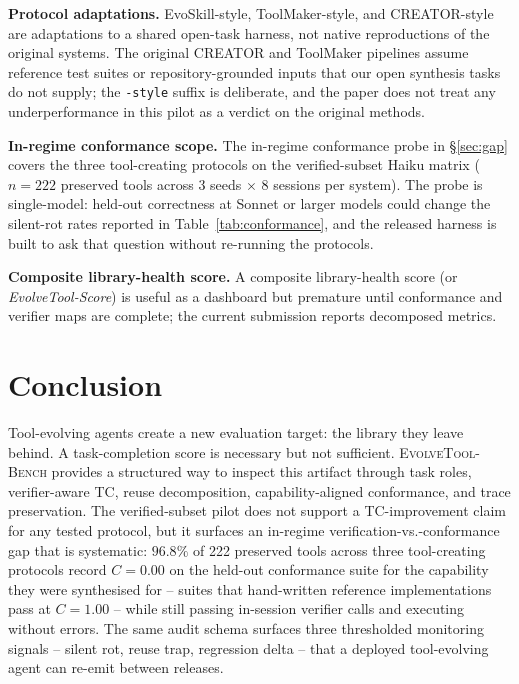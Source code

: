 \documentclass[sigconf,anonymous,natbib=false]{acmart}
\begin{document}
\textbf{Protocol adaptations.} EvoSkill-style, ToolMaker-style, and CREATOR-style are adaptations to a shared open-task harness, not native reproductions of the original systems. The original CREATOR and ToolMaker pipelines assume reference test suites or repository-grounded inputs that our open synthesis tasks do not supply; the \texttt{-style} suffix is deliberate, and the paper does not treat any underperformance in this pilot as a verdict on the original methods.

\textbf{In-regime conformance scope.} The in-regime conformance probe in \S\ref{sec:gap} covers the three tool-creating protocols on the verified-subset Haiku matrix ($n{=}222$ preserved tools across 3 seeds $\times$ 8 sessions per system). The probe is single-model: held-out correctness at Sonnet or larger models could change the silent-rot rates reported in Table~\ref{tab:conformance}, and the released harness is built to ask that question without re-running the protocols.

\textbf{Composite library-health score.} A composite library-health score (or \emph{EvolveTool-Score}) is useful as a dashboard but premature until conformance and verifier maps are complete; the current submission reports decomposed metrics.

\section{Conclusion}

Tool-evolving agents create a new evaluation target: the library they leave behind. A task-completion score is necessary but not sufficient. \textsc{EvolveTool-Bench} provides a structured way to inspect this artifact through task roles, verifier-aware TC, reuse decomposition, capability-aligned conformance, and trace preservation. The verified-subset pilot does not support a TC-improvement claim for any tested protocol, but it surfaces an in-regime verification-vs.-conformance gap that is systematic: $96.8\%$ of 222 preserved tools across three tool-creating protocols record $C{=}0.00$ on the held-out conformance suite for the capability they were synthesised for -- suites that hand-written reference implementations pass at $C{=}1.00$ -- while still passing in-session verifier calls and executing without errors. The same audit schema surfaces three thresholded monitoring signals -- silent rot, reuse trap, regression delta -- that a deployed tool-evolving agent can re-emit between releases.
\end{document}
